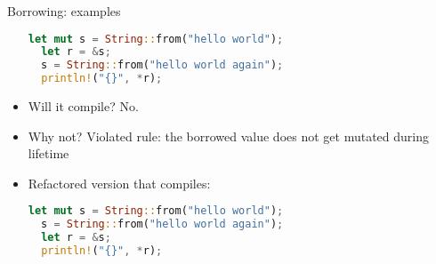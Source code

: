 \documentclass{beamer}
\begin{document}
\begin{frame}[fragile]{Borrowing: examples}
\begin{itemize}
  \begin{lstlisting}[language=Rust]
  let mut s = String::from("hello world");
  let r = &s;
  s = String::from("hello world again");
  println!("{}", *r);
  \end{lstlisting}

  \item Will it compile? \pause No.
  \item Why not? Violated rule: the borrowed value does not get mutated during lifetime
  \item Refactored version that compiles:\pause

  \begin{lstlisting}[language=Rust]
  let mut s = String::from("hello world");
  s = String::from("hello world again");
  let r = &s;
  println!("{}", *r);
  \end{lstlisting}
\end{itemize}
\end{frame}






\end{document}
